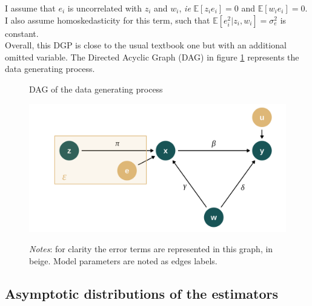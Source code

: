 \documentclass[usletter, 12pt]{article}
\begin{document}
				I assume that $e_{i}$ is uncorrelated with $z_i$ and $w_{i}$, \textit{ie} $\mathbb{E}[z_ie_{i}] = 0$ and $\mathbb{E}[w_ie_{i}] = 0$. I also assume homoskedasticity for this term, such that $\mathbb{E}[e_{i}^{2} | z_{i}, w_{i}] = \sigma_{e}^{2}$ is constant.\\ %
				
				Overall, this DGP is close to the usual textbook one but with an additional omitted variable. The Directed Acyclic Graph (DAG) in figure \ref{DAG} represents the data generating process.
			
			 \begin{figure}[!h] 
                    			\begin{center}
                    				\caption{DAG of the data generating process}
                    				\label{DAG}
                    				\includegraphics[width=0.6\linewidth]{images/DAG_maths.png}
                                   \caption*{\footnotesize \textit{Notes}: for clarity the error terms are represented in this graph, in beige. Model parameters are noted as edges labels.}
                                    \end{center}
				\vspace{-1cm}
                    		\end{figure} 

				
		
		\subsection{Asymptotic distributions of the estimators}\label{maths_asymptotics}			 
			
\end{document}
